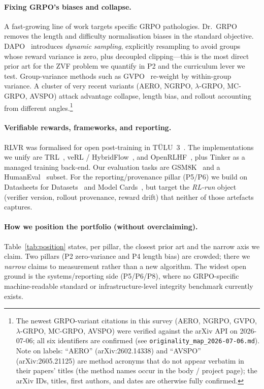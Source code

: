 \documentclass[12pt,a4paper]{report}
\begin{document}
\paragraph{Fixing GRPO's biases and collapse.}
A fast-growing line of work targets specific GRPO pathologies. Dr.\
GRPO~\cite{liu2025drgrpo} removes the length and difficulty normalisation biases
in the standard objective. DAPO~\cite{yu2025dapo} introduces \emph{dynamic
sampling}, explicitly resampling to avoid groups whose reward variance is zero,
plus decoupled clipping---this is the most direct prior art for the ZVF problem
we quantify in P2 and the curriculum lever we test. Group-variance methods such
as GVPO~\cite{gvpo2025} re-weight by within-group variance. A cluster of very
recent variants (AERO, NGRPO, $\lambda$-GRPO, MC-GRPO, AVSPO) attack advantage
collapse, length bias, and rollout accounting from different angles.\footnote{The
newest GRPO-variant citations in this survey (AERO, NGRPO, GVPO, $\lambda$-GRPO,
MC-GRPO, AVSPO) were verified against the arXiv API on 2026-07-06; all six
identifiers are confirmed (see \texttt{originality\_map\_2026-07-06.md}). Note on
labels: ``AERO'' (arXiv:2602.14338) and ``AVSPO'' (arXiv:2605.21125) are method
acronyms that do not appear verbatim in their papers' titles (the method names
occur in the body / project page); the arXiv IDs, titles, first authors, and dates
are otherwise fully confirmed.}

\paragraph{Verifiable rewards, frameworks, and reporting.}
RLVR was formalised for open post-training in TÜLU~3~\cite{lambert2024tulu3}. The
implementations we unify are TRL~\cite{vonwerra2020trl}, veRL /
HybridFlow~\cite{sheng2024hybridflow}, and OpenRLHF~\cite{hu2024openrlhf}, plus
Tinker as a managed training back-end. Our evaluation tasks are
GSM8K~\cite{cobbe2021gsm8k} and a HumanEval~\cite{chen2021humaneval} subset. For
the reporting/provenance pillar (P5/P6) we build on Datasheets for
Datasets~\cite{gebru2021datasheets} and Model Cards~\cite{mitchell2019modelcards},
but target the \emph{RL-run} object (verifier version, rollout provenance, reward
drift) that neither of those artefacts captures.

\paragraph{How we position the portfolio (without overclaiming).}
Table~\ref{tab:position} states, per pillar, the closest prior art and the
narrow axis we claim. Two pillars (P2 zero-variance and P4 length bias) are
crowded; there we \emph{narrow} claims to measurement rather than a new
algorithm. The widest open ground is the systems/reporting side (P5/P6/P8),
where no GRPO-specific machine-readable standard or infrastructure-level
integrity benchmark currently exists.
\end{document}

